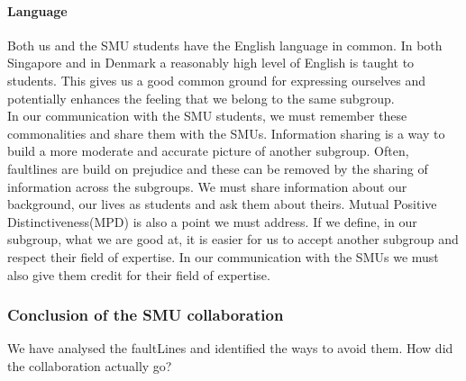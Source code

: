 \documentclass[a4paper,11pt,report]{article}
\begin{document}
\paragraph{Language}
Both us and the SMU students have the English language in common. In both Singapore and in Denmark a reasonably high level of English is taught to students. This gives us a good common ground for expressing ourselves and potentially enhances the feeling that we belong to the same subgroup. \\

In our communication with the SMU students, we must remember these commonalities and share them with the SMUs. Information sharing\cite{smu} is a way to build a more moderate and accurate picture of another subgroup. Often, faultlines are build on prejudice and these can be removed by the sharing of information across the subgroups. We must share information about our background, our lives as students and ask them about theirs. Mutual Positive Distinctiveness(MPD)\cite{smu} is also a point we must address. If we define, in our subgroup, what we are good at, it is easier for us to accept another subgroup and respect their field of expertise. In our communication with the SMUs we must also give them credit for their field of expertise. \\

\subsubsection{Conclusion of the SMU collaboration}

We have analysed the faultLines and identified the ways to avoid them. How did the collaboration actually go? \\
\end{document}
